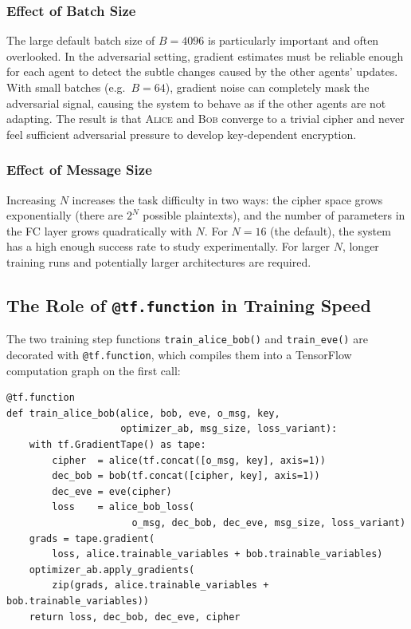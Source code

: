 \documentclass[12pt, a4paper]{article}
\newcommand{\alice}{\textsc{Alice}}
\newcommand{\bob}{\textsc{Bob}}
\newcommand{\code}[1]{\texttt{\color{CodeRed}#1}}
\begin{document}
\subsubsection*{Effect of Batch Size}

The large default batch size of $B=4096$ is particularly important
and often overlooked. In the adversarial setting, gradient estimates
must be reliable enough for each agent to detect the subtle changes
caused by the other agents' updates. With small batches (e.g.\ $B=64$),
gradient noise can completely mask the adversarial signal, causing the
system to behave as if the other agents are not adapting. The result
is that \alice{} and \bob{} converge to a trivial cipher and never
feel sufficient adversarial pressure to develop key-dependent encryption.

\subsubsection*{Effect of Message Size}

Increasing $N$ increases the task difficulty in two ways: the cipher
space grows exponentially (there are $2^N$ possible plaintexts), and
the number of parameters in the FC layer grows quadratically with $N$.
For $N=16$ (the default), the system has a high enough success rate
to study experimentally. For larger $N$, longer training runs and
potentially larger architectures are required.

\subsection{The Role of \texttt{@tf.function} in Training Speed}
\label{subsec:tf_function}

The two training step functions \code{train\_alice\_bob()} and
\code{train\_eve()} are decorated with \code{@tf.function}, which
compiles them into a TensorFlow computation graph on the first call:
\newpage
\begin{lstlisting}[caption={\texttt{@tf.function} compilation of training steps}]
@tf.function
def train_alice_bob(alice, bob, eve, o_msg, key,
                    optimizer_ab, msg_size, loss_variant):
    with tf.GradientTape() as tape:
        cipher  = alice(tf.concat([o_msg, key], axis=1))
        dec_bob = bob(tf.concat([cipher, key], axis=1))
        dec_eve = eve(cipher)
        loss    = alice_bob_loss(
                      o_msg, dec_bob, dec_eve, msg_size, loss_variant)
    grads = tape.gradient(
        loss, alice.trainable_variables + bob.trainable_variables)
    optimizer_ab.apply_gradients(
        zip(grads, alice.trainable_variables + bob.trainable_variables))
    return loss, dec_bob, dec_eve, cipher
\end{lstlisting}
\end{document}
